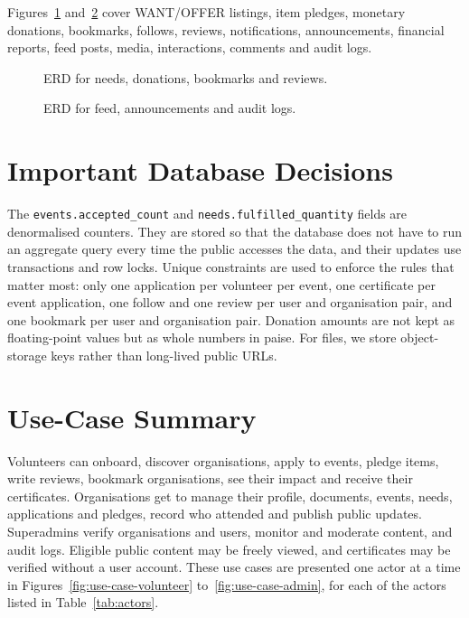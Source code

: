 Figures~\ref{fig:erd-engagement-a} and~\ref{fig:erd-engagement-b} cover WANT/OFFER listings, item pledges, monetary donations, bookmarks, follows, reviews, notifications, announcements, financial reports, feed posts, media, interactions, comments and audit logs.

\clearpage
\begin{figure}[H]
    \centering
    \caption{ERD for needs, donations, bookmarks and reviews.}
    \label{fig:erd-engagement-a}
\end{figure}

\vspace{0.3in}
\begin{figure}[H]
    \centering
    \caption{ERD for feed, announcements and audit logs.}
    \label{fig:erd-engagement-b}
\end{figure}

\clearpage

\section{Important Database Decisions}
The \texttt{events.accepted\_count} and \texttt{needs.fulfilled\_quantity} fields are denormalised counters. They are stored so that the database does not have to run an aggregate query every time the public accesses the data, and their updates use transactions and row locks. Unique constraints are used to enforce the rules that matter most: only one application per volunteer per event, one certificate per event application, one follow and one review per user and organisation pair, and one bookmark per user and organisation pair. Donation amounts are not kept as floating-point values but as whole numbers in paise. For files, we store object-storage keys rather than long-lived public URLs.

\section{Use-Case Summary}
Volunteers can onboard, discover organisations, apply to events, pledge items, write reviews, bookmark organisations, see their impact and receive their certificates. Organisations get to manage their profile, documents, events, needs, applications and pledges, record who attended and publish public updates. Superadmins verify organisations and users, monitor and moderate content, and audit logs. Eligible public content may be freely viewed, and certificates may be verified without a user account. These use cases are presented one actor at a time in Figures~\ref{fig:use-case-volunteer} to~\ref{fig:use-case-admin}, for each of the actors listed in Table~\ref{tab:actors}.


